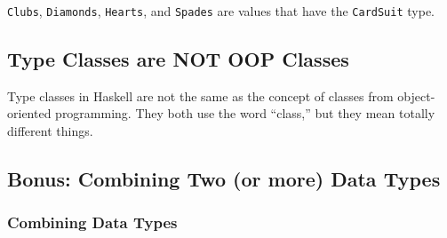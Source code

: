 \texttt{Clubs}, \texttt{Diamonds}, \texttt{Hearts}, and \texttt{Spades}
are values that have the \texttt{CardSuit} type.

\hypertarget{type-classes-are-not-oop-classes}{%
\subsection{Type Classes are NOT OOP
Classes}\label{type-classes-are-not-oop-classes}}

Type classes in Haskell are not the same as the concept of classes from
object-oriented programming. They both use the word ``class,'' but they
mean totally different things.

\hypertarget{bonus-combining-two-or-more-data-types}{%
\subsection{Bonus: Combining Two (or more) Data
Types}\label{bonus-combining-two-or-more-data-types}}

\hypertarget{combining-data-types}{%
\subsubsection{Combining Data Types}\label{combining-data-types}}

\begin{Shaded}
\begin{Highlighting}[]
  \OtherTok{=}  \OperatorTok{|}  \OperatorTok{|}  \OperatorTok{|} 
  \NormalTok{ (}\NormalTok{, }\NormalTok{, }\NormalTok{)}

 
  \OtherTok{=}   \OperatorTok{|}   \OperatorTok{|}   \OperatorTok{|}   \OperatorTok{|}   \OperatorTok{|}   \OperatorTok{|}   
  \OperatorTok{|}   \OperatorTok{|}   \OperatorTok{|}  \OperatorTok{|}   \OperatorTok{|}  \OperatorTok{|} 
  \NormalTok{ (}\NormalTok{, }\NormalTok{, }\NormalTok{)}

  \OtherTok{=}\NormalTok{ (}\NormalTok{, }\NormalTok{)}

 
  \OtherTok{=} 
  \OperatorTok{|}   
  \NormalTok{ (}\NormalTok{, }\NormalTok{, }\NormalTok{)}
\end{Highlighting}
\end{Shaded}

